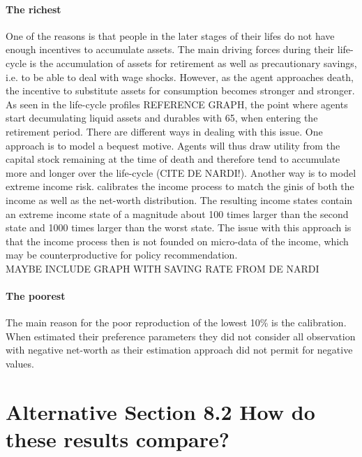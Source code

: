 \documentclass[a4paper,12pt,legno]{article}
\begin{document}
\paragraph{The richest}
One of the reasons is that people in the later stages of their lifes do not have enough incentives to accumulate assets. The main driving forces during their life-cycle is the accumulation of assets for retirement as well as precautionary savings, i.e. to be able to deal with wage shocks. However, as the agent approaches death, the incentive to substitute assets for consumption becomes stronger and stronger. As seen in the life-cycle profiles REFERENCE GRAPH, the point where agents start decumulating liquid assets and durables with 65, when entering the retirement period. There are different ways in dealing with this issue. One approach is to model a bequest motive. Agents will thus draw utility from the capital stock remaining at the time of death and therefore tend to accumulate more and longer over the life-cycle (CITE DE NARDI!). Another way is to model extreme income risk. \citep{castaneda2003} calibrates the income process to match the ginis of both the income as well as the net-worth distribution. The resulting income states contain an extreme income state of a magnitude about 100 times larger than the second state and 1000 times larger than the worst state. The issue with this approach is that the income process then is not founded on micro-data of the income, which may be counterproductive for policy recommendation. 
\\
MAYBE INCLUDE GRAPH WITH SAVING RATE FROM DE NARDI
\\
\paragraph{The poorest}
The main reason for the poor reproduction of the lowest 10\% is the calibration. When \cite{hintermaier2011} estimated their preference parameters they did not consider all observation with negative net-worth as their estimation approach did not permit for negative values.

\section{Alternative Section 8.2 How do these results compare?}
\end{document}
